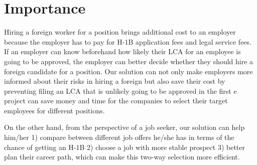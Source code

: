 \documentclass{article}
\begin{document}
\section{Importance}
Hiring a foreign worker for a position brings additional cost to an employer because the employer has to pay for H-1B application fees and legal service fees. If an employer can know beforehand how likely their LCA for an employee is going to be approved, the employer can better decide whether they should hire a foreign candidate for a position. Our solution can not only make employers more informed about their risks in hiring a foreign but also save their cost by preventing filing an LCA that is unlikely going to be approved in the first e project can save money and time for the companies to select their target employees for different positions. 
 
On the other hand, from the perspective of a job seeker, our solution can help him/her 1) compare between different job offers he/she has in terms of the chance of getting an H-1B 2) choose a job with more stable prospect 3) better plan their career path, which can make this two-way selection more efficient. 
\end{document}
